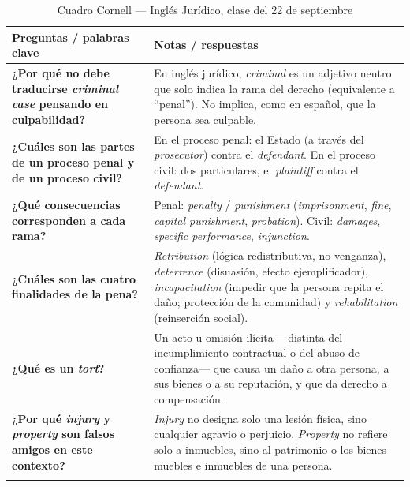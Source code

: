 \documentclass[12pt,oneside]{book}
\begin{document}
\begin{table}[H]
\centering
\caption{Cuadro Cornell --- Inglés Jurídico, clase del 22 de septiembre}
\begin{tabularx}{\textwidth}{
    >{\raggedright\arraybackslash}p{}
    >{\raggedright\arraybackslash}X
}
\toprule
\textbf{Preguntas / palabras clave} & \textbf{Notas / respuestas} \\
\midrule

\textbf{¿Por qué no debe traducirse \textit{criminal case} pensando en culpabilidad?} &
En inglés jurídico, \textit{criminal} es un adjetivo neutro que solo indica la rama del derecho (equivalente a ``penal''). No implica, como en español, que la persona sea culpable. \\
\addlinespace

\textbf{¿Cuáles son las partes de un proceso penal y de un proceso civil?} &
En el proceso penal: el Estado (a través del \textit{prosecutor}) contra el \textit{defendant}. En el proceso civil: dos particulares, el \textit{plaintiff} contra el \textit{defendant}. \\
\addlinespace

\textbf{¿Qué consecuencias corresponden a cada rama?} &
Penal: \textit{penalty} / \textit{punishment} (\textit{imprisonment}, \textit{fine}, \textit{capital punishment}, \textit{probation}). Civil: \textit{damages}, \textit{specific performance}, \textit{injunction}. \\
\addlinespace

\textbf{¿Cuáles son las cuatro finalidades de la pena?} &
\textit{Retribution} (lógica redistributiva, no venganza), \textit{deterrence} (disuasión, efecto ejemplificador), \textit{incapacitation} (impedir que la persona repita el daño; protección de la comunidad) y \textit{rehabilitation} (reinserción social). \\
\addlinespace

\textbf{¿Qué es un \textit{tort}?} &
Un acto u omisión ilícita ---distinta del incumplimiento contractual o del abuso de confianza--- que causa un daño a otra persona, a sus bienes o a su reputación, y que da derecho a compensación. \\
\addlinespace

\textbf{¿Por qué \textit{injury} y \textit{property} son falsos amigos en este contexto?} &
\textit{Injury} no designa solo una lesión física, sino cualquier agravio o perjuicio. \textit{Property} no refiere solo a inmuebles, sino al patrimonio o los bienes muebles e inmuebles de una persona. \\
\addlinespace


\end{tabularx}
\end{table}
\end{document}
